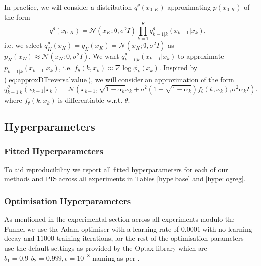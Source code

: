 \documentclass{article} %
\begin{document}
In practice, we will consider a distribution $q^{\theta}(x_{0:K})$ approximating $p(x_{0:K})$ of the form
\begin{equation}\label{eq:proposalqreversetime}
    q^{\theta}(x_{0:K})=\mathcal{N}(x_K;0,\sigma^2 I)\prod_{k=1}^K q^\theta_{k-1|k}(x_{k-1}|x_k),
\end{equation}
i.e. we select $q^{\theta}_K(x_{K})=q_K(x_{K})=\mathcal{N}(x_K;0,\sigma^2 I)$ as $p_K(x_K)\approx \mathcal{N}(x_K;0,\sigma^2 I)$. We want $q^\theta_{k-1|k}(x_{k-1}|x_k)$ to approximate $p_{k-1|k}(x_{k-1}|x_k)$, i.e. $f_\theta(k,x_k) \approx \nabla \log \phi_k(x_k)$. 
Inspired by (\ref{eq:approxDTreversalvalue}), we will consider an approximation of the form 
\begin{equation} \label{eq:algo_param}
    q^\theta_{k-1|k}(x_{k-1}|x_k)=\mathcal{N}(x_{k-1};\sqrt{1-\alpha_k}x_k+\sigma^2(1-\sqrt{1-\alpha_k}) f_\theta(k,x_k),\sigma^2 \alpha_k I).
\end{equation}
where $f_\theta(k,x_k)$ is differentiable w.r.t. $\theta$.

\subsection{Hyperparameters}

\subsubsection{Fitted Hyperparameters}

To aid reproducibility we report all fitted hyperparameters for each of our methods and PIS across all experiments in Tables \ref{hype:base} and \ref{hype:logreg}.

\subsubsection{Optimisation Hyperparameters}

As mentioned in the experimental section across all experiments modulo the Funnel we use the Adam optimiser with a learning rate of $0.0001$ with no learning decay and $11000$ training iterations, for the rest of the optimisation parameters use the default settings as provided by the Optax library \citep{optax2020github} which are $b_1=0.9, b_2=0.999, \epsilon=10^{-8}$ naming as per \cite{Kingma:2014}.
\end{document}
